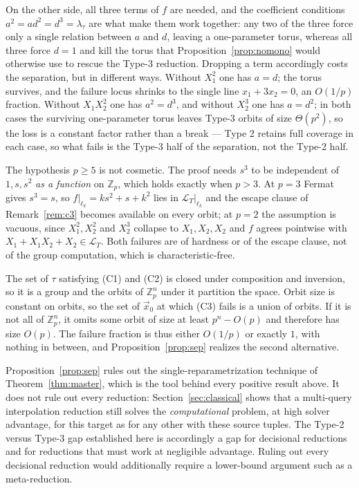 \documentclass{aicr-solution}
\newcommand{\Zp}{\mathbb{Z}_p}
\newcommand{\vx}{\vec{x}}
\newcommand{\LL}{\mathcal{L}}
\begin{document}
On the other side, all three terms of $f$ are needed, and the coefficient conditions
$a^{2}=ad^{2}=d^{3}=\lambda_\tau$ are what make them work together: any two of the three force
only a single relation between $a$ and $d$, leaving a one-parameter torus, whereas all three
force $d=1$ and kill the torus that Proposition~\ref{prop:nomono} would otherwise use to
rescue the Type-3 reduction. Dropping a term accordingly costs the separation, but in
different ways. Without $X_1^{2}$ one has $a=d$; the torus survives, and the failure locus
shrinks to the single line $x_1+3x_2=0$, an $O(1/p)$ fraction. Without $X_1X_2^{2}$ one has
$a^{2}=d^{3}$, and without $X_2^{3}$ one has $a=d^{2}$; in both cases the surviving
one-parameter torus leaves Type-3 orbits of size $\Theta(p^{2})$, so the loss is a constant
factor rather than a break --- Type 2 retains full coverage in each case, so what fails is the
Type-3 half of the separation, not the Type-2 half.

The hypothesis $p\ge 5$ is not cosmetic. The proof needs $s^{3}$ to be independent of
$1,s,s^{2}$ \emph{as a function} on $\Zp$, which holds exactly when $p>3$. At $p=3$ Fermat
gives $s^{3}=s$, so $f|_{\ell_k}=ks^{2}+s+k^{2}$ lies in $\LL_T|_{\ell_k}$ and the escape
clause of Remark~\ref{rem:c3} becomes available on every orbit; at $p=2$ the assumption is
vacuous, since $X_1^{2},X_2^{2}$ and $X_2^{3}$ collapse to $X_1,X_2,X_2$ and $f$ agrees
pointwise with $X_1+X_1X_2+X_2\in\LL_T$. Both failures are of hardness or of the escape
clause, not of the group computation, which is characteristic-free.

\begin{remark}
\label{rem:dichotomy}
The set of $\tau$ satisfying (C1) and (C2) is closed under composition and inversion, so it is
a group and the orbits of $\Zp^{n}$ under it partition the space. Orbit size is constant on
orbits, so the set of $\vx_0$ at which (C3) fails is a union of orbits. If it is not all of
$\Zp^{n}$, it omits some orbit of size at least $p^{n}-O(p)$ and therefore has size $O(p)$.
The failure fraction is thus either $O(1/p)$ or exactly $1$, with nothing in between, and
Proposition~\ref{prop:sep} realizes the second alternative.
\end{remark}

Proposition~\ref{prop:sep} rules out the single-reparametrization technique of
Theorem~\ref{thm:master}, which is the tool behind every positive result above. It does not
rule out every reduction: Section~\ref{sec:classical} shows that a multi-query interpolation
reduction still solves the \emph{computational} problem, at high solver advantage, for this
target as for any other with these source tuples. The Type-2 versus Type-3 gap established
here is accordingly a gap for decisional reductions and for reductions that must work at
negligible advantage. Ruling out every decisional reduction would additionally require a
lower-bound argument such as a meta-reduction.
\end{document}
